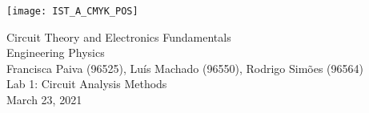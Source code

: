 
\thispagestyle {empty}

\texttt{[image: IST\_A\_CMYK\_POS]}

\begin{center}
%
\vspace{1.0cm}

\vspace{1cm}
{\FontLb Circuit Theory and Electronics Fundamentals} \\ %
\vspace{1cm}
{\FontSn Engineering Physics} \\ %
{\small Francisca Paiva (96525), Luís Machado (96550), Rodrigo Simões (96564)} \\
\vspace{1cm}
{\FontSn Lab 1: Circuit Analysis Methods} \\
\vspace{1cm}
{\FontSn March 23, 2021} \\ %
%
\end{center}
